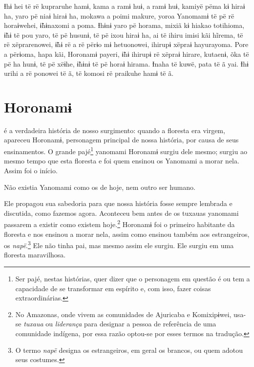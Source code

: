 Ɨhɨ hei të rë kupraruhe hamɨ, kama a ramɨ huɨ, a ramɨ huɨ, kamiyë pëma
kɨ hiraɨ ha, yaro pë niaɨ hiraɨ ha, mokawa a poimi makure, yoroa
Yanomamɨ të pë rë horaɨwehei, ɨ̃hɨnaxomi a poma. Ɨhɨnɨ yaro pë horama,
mixiã kɨ hiakao totihioma, ɨ̃hɨ të pou yaro, të pë husunɨ, të pë ixou
hiraɨ ha, ai të ihiru imisi kãi hĩrema, të rë xëprarenowei, ɨ̃hɨ rë a rë
përɨo mɨ hetuonowei, ihirupɨ xëpraɨ hayurayoma. Pore a përɨoma, hapa
kãi, Horonamɨ payeri, ɨ̃hɨ ihirupɨ rë xëpraɨ hirare, kutaenɨ, õka të pë
ha hunɨ, të pë xëɨhe, ɨ̃hɨnɨ të pë horaɨ hirama. Ɨnaha të kuwë, pata të ã
yai. Ɨhɨ urihi a rë ponowei të ã, të komosi rë praikuhe hamɨ të ã.

\chapter{Horonamɨ}
 

 é a verdadeira história de nosso surgimento: quando a floresta era
virgem, apareceu Horonamɨ, personagem principal de nossa história, por
causa de seus ensinamentos. O grande pajé\footnote{Ser pajé, nestas histórias, quer dizer que o personagem em questão é ou tem a capacidade de se transformar em espírito e, com isso, fazer coisas
extraordinárias.}  yanomami Horonamɨ surgiu dele mesmo; surgiu ao mesmo tempo que esta floresta e
foi quem ensinou os Yanomami a morar nela. Assim foi o início. 

Não existia Yanomami como os de hoje, nem outro ser humano. 

Ele propagou sua sabedoria para que nossa história fosse sempre lembrada
e discutida, como fazemos agora. Aconteceu bem antes de os tuxauas
yanomami passarem a existir como existem
hoje.\footnote{No Amazonas, onde vivem as comunidades de Ajuricaba e Komixipɨwei,
usa-se \textit{tuxaua} ou \textit{liderança} para designar a pessoa de referência
de uma comunidade indígena, por essa razão optou-se por esses termos na
tradução.}  Horonamɨ foi o primeiro habitante da floresta e
nos ensinou a morar nela, assim como ensinou também aos estrangeiros,
os \textit{napë}.\footnote{O termo \textit{napë} designa os estrangeiros, em geral os brancos, ou quem adotou seus costumes.} Ele não tinha pai, mas mesmo assim
ele surgiu. Ele surgiu em uma floresta maravilhosa. 

